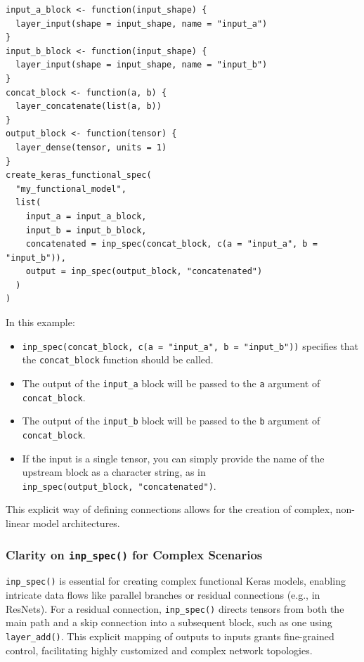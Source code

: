 \begin{verbatim}
input_a_block <- function(input_shape) {
  layer_input(shape = input_shape, name = "input_a")
}
input_b_block <- function(input_shape) {
  layer_input(shape = input_shape, name = "input_b")
}
concat_block <- function(a, b) {
  layer_concatenate(list(a, b))
}
output_block <- function(tensor) {
  layer_dense(tensor, units = 1)
}
create_keras_functional_spec(
  "my_functional_model",
  list(
    input_a = input_a_block,
    input_b = input_b_block,
    concatenated = inp_spec(concat_block, c(a = "input_a", b = "input_b")),
    output = inp_spec(output_block, "concatenated")
  )
)
\end{verbatim}

In this example:

\begin{itemize}
\tightlist
\item
  \texttt{inp\_spec(concat\_block,\ c(a\ =\ "input\_a",\ b\ =\ "input\_b"))} specifies that the \texttt{concat\_block} function should be called.
\item
  The output of the \texttt{input\_a} block will be passed to the \texttt{a} argument of \texttt{concat\_block}.
\item
  The output of the \texttt{input\_b} block will be passed to the \texttt{b} argument of \texttt{concat\_block}.
\item
  If the input is a single tensor, you can simply provide the name of the upstream block as a character string, as in \texttt{inp\_spec(output\_block,\ "concatenated")}.
\end{itemize}

This explicit way of defining connections allows for the creation of complex, non-linear model architectures.

\subsubsection{\texorpdfstring{Clarity on \texttt{inp\_spec()} for Complex Scenarios}{Clarity on inp\_spec() for Complex Scenarios}}\label{clarity-on-inp_spec-for-complex-scenarios}

\texttt{inp\_spec()} is essential for creating complex functional Keras models, enabling intricate data flows like parallel branches or residual connections (e.g., in ResNets). For a residual connection, \texttt{inp\_spec()} directs tensors from both the main path and a skip connection into a subsequent block, such as one using \texttt{layer\_add()}. This explicit mapping of outputs to inputs grants fine-grained control, facilitating highly customized and complex network topologies.


